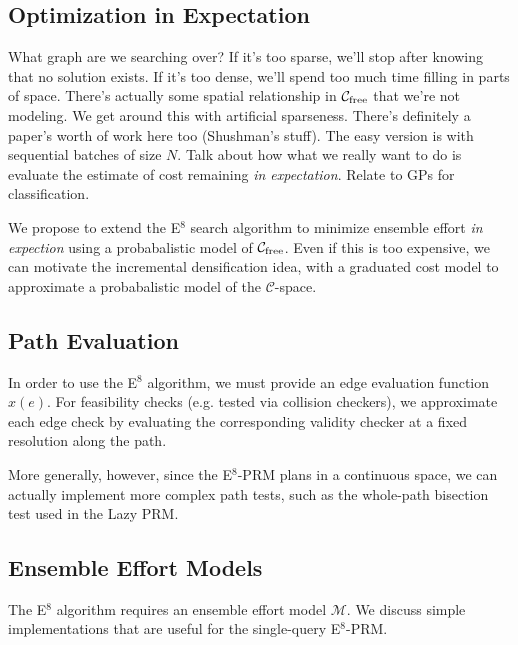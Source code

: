 \subsection{Optimization in Expectation}

What graph are we searching over?
If it's too sparse, we'll stop after knowing that no solution exists.
If it's too dense, we'll spend too much time filling in parts of
space.
There's actually some spatial relationship in
$\mathcal{C}_{\mbox{\scriptsize free}}$ that we're not
modeling.
We get around this with artificial sparseness.
There's definitely a paper's worth of work here too (Shushman's stuff).
The easy version is with sequential batches of size $N$.
Talk about how what we really want to do
is evaluate the estimate of cost remaining
\emph{in expectation}.
Relate to GPs for classification\cite{rasmussen2006gpml}.

We propose to extend the E$^8$ search algorithm
to minimize ensemble effort \emph{in expection}
using a probabalistic model of $\mathcal{C}_{\mbox{\scriptsize free}}$.
Even if this is too expensive,
we can motivate the incremental densification idea,
with a graduated cost model
to approximate a probabalistic model
of the $\mathcal{C}$-space.

\subsection{Path Evaluation}
\label{subsec:prm-path-eval}

In order to use the E$^8$ algorithm,
we must provide an edge evaluation function $x(e)$.
For feasibility checks
(e.g. tested via collision checkers),
we approximate each edge check
by evaluating the corresponding validity checker
at a fixed resolution along the path.

More generally, however,
since the E$^8$-PRM plans in a continuous space,
we can actually implement more complex path tests,
such as the whole-path bisection test used in the
Lazy PRM.

\subsection{Ensemble Effort Models}

The E$^8$ algorithm requires an ensemble effort model
$\mathcal{M}$.
We discuss simple implementations that are useful
for the single-query E$^8$-PRM.

